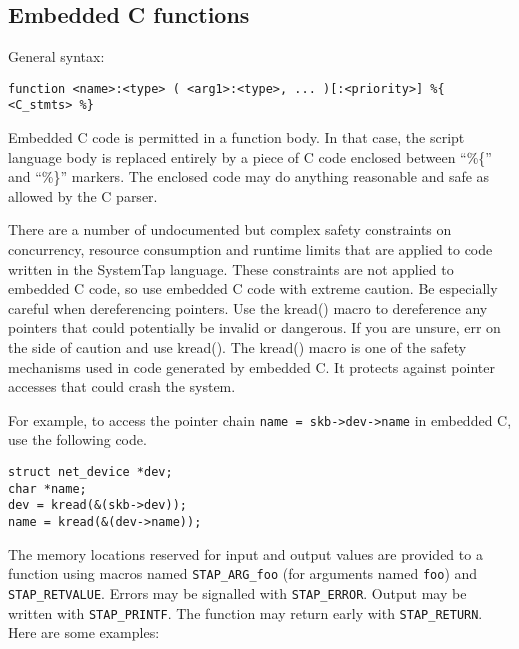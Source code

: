 \documentclass[twoside,english]{article}
\newenvironment{vindent}
{\begin{list}{}{\setlength{\listparindent}{6pt}}
\item[]}
{\end{list}}
\begin{document}
\subsection{Embedded C functions\label{sub:Embedded-C-Functions}}

General syntax:

\begin{vindent}
\begin{verbatim}
function <name>:<type> ( <arg1>:<type>, ... )[:<priority>] %{ <C_stmts> %}
\end{verbatim}
\end{vindent}
Embedded C code is permitted in a function body.
In that case, the script language
body is replaced entirely by a piece of C code enclosed between 
{}``\%\{'' and {}``\%\}'' markers.
The enclosed code may do anything reasonable and safe as allowed
by the C parser.

There are a number of undocumented but complex safety constraints on concurrency,
resource consumption and runtime limits that are applied to code written
in the SystemTap language. These constraints are not applied to embedded
C code, so use embedded C code with extreme caution. Be especially
careful when dereferencing pointers. Use the kread() macro to dereference
any pointers that could potentially be invalid or dangerous. If you are unsure,
err on the side of caution and use kread(). The kread() macro is one of the
safety mechanisms used in code generated by embedded C. It protects against
pointer accesses that could crash the system.

For example, to access the pointer chain \texttt{name = skb->dev->name} in
embedded C, use the following code.

\begin{vindent}
\begin{verbatim}
struct net_device *dev;
char *name;
dev = kread(&(skb->dev));
name = kread(&(dev->name));
\end{verbatim}
\end{vindent}

The memory locations reserved for input and output values are provided
to a function using macros named
\texttt{STAP\_ARG\_foo} (for arguments named
\texttt{foo}) and \texttt{STAP\_RETVALUE}.
Errors may be signalled with \texttt{STAP\_ERROR}. Output may be written
with \texttt{STAP\_PRINTF}. The function may return                       early with \texttt{STAP\_RETURN}.  Here are some examples:
\end{document}
